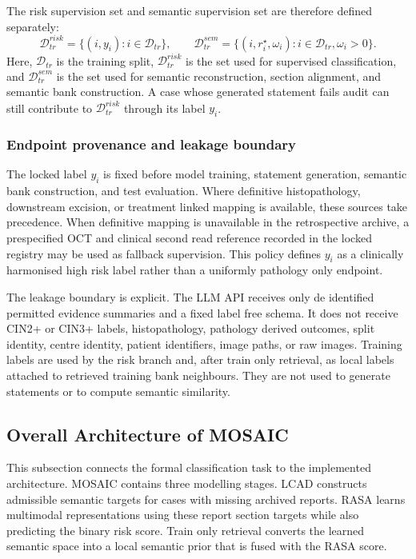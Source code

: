 The risk supervision set and semantic supervision set are therefore defined separately:
\begin{equation}
\mathcal{D}_{tr}^{risk}=\{(i,y_i):i\in\mathcal{D}_{tr}\},
\qquad
\mathcal{D}_{tr}^{sem}=\{(i,r_i^{\star},\omega_i):i\in\mathcal{D}_{tr},\omega_i>0\}.
\label{eq:risk_semantic_sets}
\end{equation}
Here, $\mathcal{D}_{tr}$ is the training split, $\mathcal{D}_{tr}^{risk}$ is the set used for supervised classification, and $\mathcal{D}_{tr}^{sem}$ is the set used for semantic reconstruction, section alignment, and semantic bank construction. A case whose generated statement fails audit can still contribute to $\mathcal{D}_{tr}^{risk}$ through its label $y_i$.

\subsubsection{Endpoint provenance and leakage boundary}
\label{subsubsec:endpoint_provenance_leakage_boundary}

The locked label $y_i$ is fixed before model training, statement generation, semantic bank construction, and test evaluation. Where definitive histopathology, downstream excision, or treatment linked mapping is available, these sources take precedence. When definitive mapping is unavailable in the retrospective archive, a prespecified OCT and clinical second read reference recorded in the locked registry may be used as fallback supervision. This policy defines $y_i$ as a clinically harmonised high risk label rather than a uniformly pathology only endpoint.

The leakage boundary is explicit. The LLM API receives only de identified permitted evidence summaries and a fixed label free schema. It does not receive CIN2+ or CIN3+ labels, histopathology, pathology derived outcomes, split identity, centre identity, patient identifiers, image paths, or raw images. Training labels are used by the risk branch and, after train only retrieval, as local labels attached to retrieved training bank neighbours. They are not used to generate statements or to compute semantic similarity.

\subsection{Overall Architecture of MOSAIC}
\label{subsec:overall_architecture}

This subsection connects the formal classification task to the implemented architecture. MOSAIC contains three modelling stages. LCAD constructs admissible semantic targets for cases with missing archived reports. RASA learns multimodal representations using these report section targets while also predicting the binary risk score. Train only retrieval converts the learned semantic space into a local semantic prior that is fused with the RASA score.

